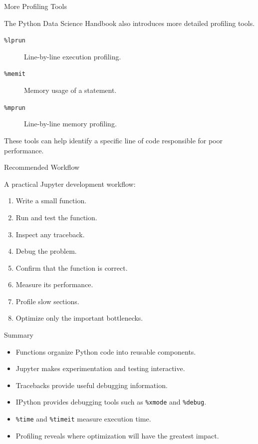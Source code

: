 \documentclass[aspectratio=43,10pt]{beamer}
\begin{document}
\begin{frame}{More Profiling Tools}

The Python Data Science Handbook also introduces more detailed profiling tools.

\begin{description}
  \item[\texttt{\%lprun}] Line-by-line execution profiling.
  \item[\texttt{\%memit}] Memory usage of a statement.
  \item[\texttt{\%mprun}] Line-by-line memory profiling.
\end{description}

\vspace{0.4cm}

These tools can help identify a specific line of code responsible for poor performance.

\end{frame}

\begin{frame}{Recommended Workflow}

A practical Jupyter development workflow:

\begin{enumerate}
  \item Write a small function.
  \item Run and test the function.
  \item Inspect any traceback.
  \item Debug the problem.
  \item Confirm that the function is correct.
  \item Measure its performance.
  \item Profile slow sections.
  \item Optimize only the important bottlenecks.
\end{enumerate}

\end{frame}

\begin{frame}{Summary}

\begin{itemize}
  \item Functions organize Python code into reusable components.
  \item Jupyter makes experimentation and testing interactive.
  \item Tracebacks provide useful debugging information.
  \item IPython provides debugging tools such as \texttt{\%xmode} and \texttt{\%debug}.
  \item \texttt{\%time} and \texttt{\%timeit} measure execution time.
  \item Profiling reveals where optimization will have the greatest impact.
\end{itemize}

\end{frame}
\end{document}
